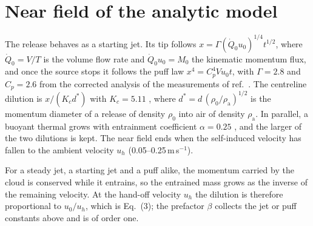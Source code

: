 \documentclass[11pt]{article}
\begin{document}
\section{Near field of the analytic model}
\label{sec:si-nearfield}
The release behaves as a starting jet. Its tip follows $x = \Gamma (\dot Q_0 u_0)^{1/4} t^{1/2}$, where
$\dot Q_0 = V/T$ is the volume flow rate and $\dot Q_0 u_0 = M_0$ the kinematic momentum flux, and once the source
stops it follows the puff law $x^4 = C_p^4 V u_0 t$, with $\Gamma = 2.8$ and $C_p = 2.6$ from the corrected analysis
\cite{diez2003} of the measurements of ref.~. The centreline dilution is $x/(K_c d^*)$ with
$K_c = 5.11$ \cite{dowling1990}, where $d^* = d\,(\rho_0/\rho_\mathrm{a})^{1/2}$ is the momentum diameter of a release
of density $\rho_0$ into air of density $\rho_\mathrm{a}$. In parallel, a buoyant thermal grows with entrainment
coefficient $\alpha = 0.25$ \cite{landeau2014}, and the larger of the two dilutions is kept. The near field ends when
the self-induced velocity has fallen to the ambient velocity $u_h$ (0.05--0.25\,m\,s$^{-1}$).

For a steady jet, a starting jet and a puff alike, the momentum carried by the cloud is conserved while it entrains,
so the entrained mass grows as the inverse of the remaining velocity. At the hand-off velocity $u_h$ the dilution is
therefore proportional to $u_0/u_h$, which is Eq.~(3); the prefactor $\beta$ collects the jet or puff constants above
and is of order one.
\end{document}
